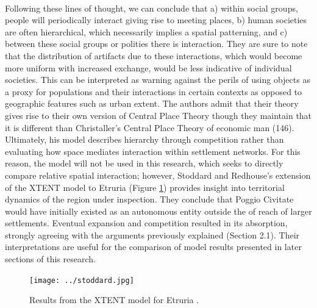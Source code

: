\documentclass[12pt,a4paper]{thesis}
\begin{document}
\paragraph{}
Following these lines of thought, we can conclude that a) within social groups, people will periodically interact giving rise to meeting places, b) human societies are often hierarchical, which necessarily implies a spatial patterning, and c) between these social groups or polities there is interaction. They are sure to note that the distribution of artifacts due to these interactions, which would become more uniform with increased  exchange, would be less indicative of individual societies. This can be interpreted as warning against the perils of using objects as a proxy for populations and their interactions in certain contexts as opposed to geographic features such as urban extent. The authors admit that their theory gives rise to their own version of Central Place Theory though they maintain that it is different than Christaller's Central Place Theory of economic man (146). Ultimately, his model describes hierarchy through competition rather than evaluating how space mediates interaction within settlement networks. For this reason, the model will not be used in this research, which seeks to directly compare relative spatial interaction; however, Stoddard and Redhouse's \citeyearpar{StoRed11} extension of the XTENT model to Etruria (Figure \ref{fig:stoddard}) provides insight into territorial dynamics of the region under inspection. They conclude that Poggio Civitate would have initially existed as an autonomous entity outside the of reach of larger settlements. Eventual expansion and competition resulted in its absorption, strongly agreeing with the arguments previously explained (Section 2.1). Their interpretations are useful for the comparison of model results presented in later sections of this research. 

\begin{figure}
\centering
\texttt{[image: ../stoddard.jpg]}
\caption[Results from the XTENT model for Etruria]{Results from the XTENT model for Etruria \citep{StoRed11}.}
\label{fig:stoddard}
\end{figure}
\end{document}
